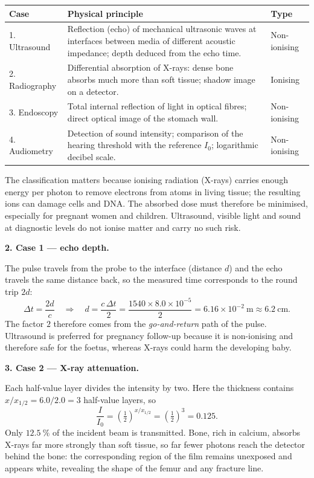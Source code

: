 \documentclass[11pt]{article}
\begin{document}
\begin{center}
\begin{tabularx}{\linewidth}{|l|X|l|}
\hline
\rowcolor{popblueL} \textbf{Case} & \textbf{Physical principle} & \textbf{Type} \\
\hline
1. Ultrasound & Reflection (echo) of mechanical ultrasonic waves at interfaces between media of different acoustic impedance; depth deduced from the echo time. & Non-ionising \\
\hline
2. Radiography & Differential absorption of X-rays: dense bone absorbs much more than soft tissue; shadow image on a detector. & Ionising \\
\hline
3. Endoscopy & Total internal reflection of light in optical fibres; direct optical image of the stomach wall. & Non-ionising \\
\hline
4. Audiometry & Detection of sound intensity; comparison of the hearing threshold with the reference $I_0$; logarithmic decibel scale. & Non-ionising \\
\hline
\end{tabularx}
\end{center}

The classification matters because ionising radiation (X-rays) carries enough energy per photon to remove electrons from atoms in living tissue; the resulting ions can damage cells and DNA. The absorbed dose must therefore be minimised, especially for pregnant women and children. Ultrasound, visible light and sound at diagnostic levels do not ionise matter and carry no such risk.

\textbf{2. Case 1 --- echo depth.}

The pulse travels from the probe to the interface (distance $d$) and the echo travels the same distance back, so the measured time corresponds to the round trip $2d$:
\[ \Delta t = \frac{2d}{c} \quad\Rightarrow\quad d = \frac{c\,\Delta t}{2} = \frac{1540 \times 8.0\times 10^{-5}}{2} = 6.16\times 10^{-2}\ \mathrm{m} \approx 6.2\ \mathrm{cm}. \]
The factor $2$ therefore comes from the \emph{go-and-return} path of the pulse. Ultrasound is preferred for pregnancy follow-up because it is non-ionising and therefore safe for the foetus, whereas X-rays could harm the developing baby.

\textbf{3. Case 2 --- X-ray attenuation.}

Each half-value layer divides the intensity by two. Here the thickness contains $x/x_{1/2} = 6.0/2.0 = 3$ half-value layers, so
\[ \frac{I}{I_0} = \left(\tfrac{1}{2}\right)^{x/x_{1/2}} = \left(\tfrac{1}{2}\right)^{3} = 0.125. \]
Only $12.5\ \%$ of the incident beam is transmitted. Bone, rich in calcium, absorbs X-rays far more strongly than soft tissue, so far fewer photons reach the detector behind the bone: the corresponding region of the film remains unexposed and appears white, revealing the shape of the femur and any fracture line.
\end{document}
